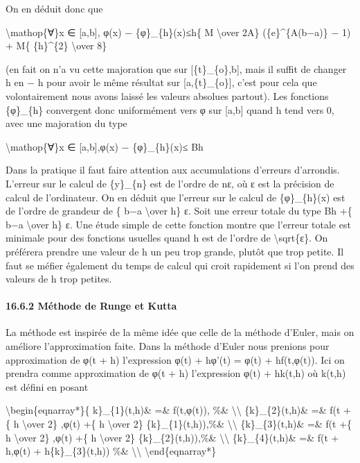 \documentclass[]{article}
\begin{document}
On en déduit donc que

\textbackslash{}mathop\{∀\}x ∈ {[}a,b{]}, \textbar{}φ(x) −
\{φ\}\_\{h\}(x)\textbar{}≤\textbar{}h\textbar{}\{ M \textbackslash{}over
2A\} (\{e\}\^{}\{A(b−a)\} − 1) + M\{ \{h\}\^{}\{2\} \textbackslash{}over
8\}

(en fait on n'a vu cette majoration que sur {[}\{t\}\_\{o\},b{]}, mais
il suffit de changer h en − h pour avoir le même résultat sur
{[}a,\{t\}\_\{o\}{]}, c'est pour cela que volontairement nous avons
laissé les valeurs absolues partout). Les fonctions \{φ\}\_\{h\}
convergent donc uniformément vers φ sur {[}a,b{]} quand h tend vers 0,
avec une majoration du type

\textbackslash{}mathop\{∀\}x ∈ {[}a,b{]},\textbar{}φ(x) −
\{φ\}\_\{h\}(x)\textbar{}≤ B\textbar{}h\textbar{}

Dans la pratique il faut faire attention aux accumulations d'erreurs
d'arrondis. L'erreur sur le calcul de \{y\}\_\{n\} est de l'ordre de nε,
où ε est la précision de calcul de l'ordinateur. On en déduit que
l'erreur sur le calcul de \{φ\}\_\{h\}(x) est de l'ordre de grandeur de
\{ b−a \textbackslash{}over h\} ε. Soit une erreur totale du type Bh +\{
b−a \textbackslash{}over h\} ε. Une étude simple de cette fonction
montre que l'erreur totale est minimale pour des fonctions usuelles
quand h est de l'ordre de \textbackslash{}sqrt\{ε\}. On préférera
prendre une valeur de h un peu trop grande, plutôt que trop petite. Il
faut se méfier également du temps de calcul qui croit rapidement si l'on
prend des valeurs de h trop petites.

\paragraph{16.6.2 Méthode de Runge et Kutta}

La méthode est inspirée de la même idée que celle de la méthode d'Euler,
mais on améliore l'approximation faite. Dans la méthode d'Euler nous
prenions pour approximation de φ(t + h) l'expression φ(t) + hφ'(t) =
φ(t) + hf(t,φ(t)). Ici on prendra comme approximation de φ(t + h)
l'expression φ(t) + hk(t,h) où k(t,h) est défini en posant

\textbackslash{}begin\{eqnarray*\}\{ k\}\_\{1\}(t,h)\& =\& f(t,φ(t)),
\%\& \textbackslash{}\textbackslash{} \{k\}\_\{2\}(t,h)\& =\& f(t +\{ h
\textbackslash{}over 2\} ,φ(t) +\{ h \textbackslash{}over 2\}
\{k\}\_\{1\}(t,h)),\%\& \textbackslash{}\textbackslash{}
\{k\}\_\{3\}(t,h)\& =\& f(t +\{ h \textbackslash{}over 2\} ,φ(t) +\{ h
\textbackslash{}over 2\} \{k\}\_\{2\}(t,h)),\%\&
\textbackslash{}\textbackslash{} \{k\}\_\{4\}(t,h)\& =\& f(t + h,φ(t) +
h\{k\}\_\{3\}(t,h)) \%\& \textbackslash{}\textbackslash{}
\textbackslash{}end\{eqnarray*\}
\end{document}

